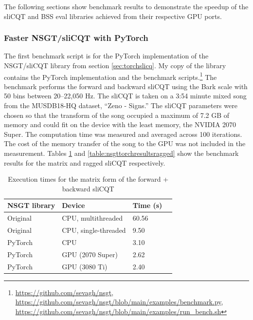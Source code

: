 \documentclass[report.tex]{subfiles}
\begin{document}
The following sections show benchmark results to demonstrate the speedup of the sliCQT and BSS eval libraries achieved from their respective GPU ports.

\subsubsection{Faster NSGT/sliCQT with PyTorch}

The first benchmark script is for the PyTorch implementation of the NSGT/sliCQT library from section \ref{sec:torchslicq}. My copy of the library contains the PyTorch implementation and the benchmark scripts.\footnote{\url{https://github.com/sevagh/nsgt}, \url{https://github.com/sevagh/nsgt/blob/main/examples/benchmark.py}, \url{https://github.com/sevagh/nsgt/blob/main/examples/run_bench.sh}} The benchmark performs the forward and backward sliCQT using the Bark scale with 50 bins between 20--22,050 Hz. The sliCQT is taken on a 3:54 minute mixed song from the MUSDB18-HQ dataset, ``Zeno - Signs.'' The sliCQT parameters were chosen so that the transform of the song occupied a maximum of 7.2 GB of memory and could fit on the device with the least memory, the NVIDIA 2070 Super. The computation time was measured and averaged across 100 iterations. The cost of the memory transfer of the song to the GPU was not included in the measurement. Tables \ref{table:nsgttorchresultsmatrix} and \ref{table:nsgttorchresultsragged} show the benchmark results for the matrix and ragged sliCQT respectively.

\begin{table}[ht]
	\centering
	\caption{Execution times for the matrix form of the forward + backward sliCQT}
	\label{table:nsgttorchresultsmatrix}
	\begin{tabular}{ |l|l|l|l| }
	 \hline
		NSGT library & Device & Time (s) \\
	 \hline
	 \hline
		Original & CPU, multithreaded & 60.56  \\
	 \hline
		Original & CPU, single-threaded & 9.50  \\
	 \hline
		PyTorch & CPU & 3.10  \\
	 \hline
		PyTorch & GPU (2070 Super) & 2.62 \\
	 \hline
		PyTorch & GPU (3080 Ti) &  2.40 \\
	 \hline
\end{tabular}
\end{table}
\end{document}
